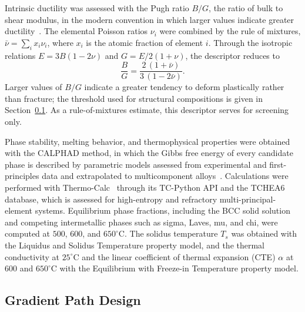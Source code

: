 Intrinsic ductility was assessed with the Pugh ratio \(B/G\), the ratio of bulk to
shear modulus, in the modern convention in which larger values indicate greater
ductility~\cite{pugh1954,singh2023ductility}. The elemental Poisson ratios
\(\nu_i\) were combined by the rule of mixtures, \(\bar{\nu}=\sum_i x_i \nu_i\),
where \(x_i\) is the atomic fraction of element \(i\). Through the isotropic
relations \(E=3B(1-2\nu)\) and \(G=E/2(1+\nu)\), the descriptor reduces to
\begin{equation}
\frac{B}{G}=\frac{2\,(1+\bar{\nu})}{3\,(1-2\bar{\nu})}.
\label{eq:pugh}
\end{equation}
Larger values of \(B/G\) indicate a greater tendency to deform plastically rather
than fracture; the threshold used for structural compositions is given in
Section~\ref{sec:joinable}. As a rule-of-mixtures estimate, this descriptor serves
for screening only.

Phase stability, melting behavior, and thermophysical properties were obtained with
the CALPHAD method, in which the Gibbs free energy of every candidate phase is
described by parametric models assessed from experimental and first-principles
data and extrapolated to multicomponent
alloys~\cite{li2023calphad,conway2022thermodynamic}. Calculations were performed
with Thermo-Calc~\cite{andersson2002thermocalc} through its TC-Python API and the
TCHEA6 database, which is assessed for
high-entropy and refractory multi-principal-element systems. Equilibrium phase
fractions, including the BCC solid solution and competing intermetallic phases such
as sigma, Laves, mu, and chi, were computed at \(500\), \(600\), and
\(650^{\circ}\mathrm{C}\). The solidus temperature \(T_s\) was obtained with the
Liquidus and Solidus Temperature property model, and the thermal conductivity at
\(25^{\circ}\mathrm{C}\) and the linear coefficient of thermal expansion (CTE)
\(\alpha\) at \(600\) and \(650^{\circ}\mathrm{C}\) with the Equilibrium with
Freeze-in Temperature property model.

\subsection{Gradient Path Design}
\label{sec:joinable}

